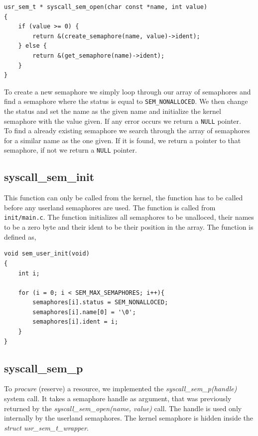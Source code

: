 \documentclass[11pt]{article}
\begin{document}
    \begin{lstlisting}[style=customc]
usr_sem_t * syscall_sem_open(char const *name, int value)
{
    if (value >= 0) {
        return &(create_semaphore(name, value)->ident);
    } else {
        return &(get_semaphore(name)->ident);
    }
}
    \end{lstlisting}

    To create a new semaphore we simply loop through our array of semaphores and
    find a semaphore where the status is equal to \texttt{SEM\_NONALLOCED}.  We
    then change the status and set the name as the given name and initialize the
    kernel semaphore with the value given.  If any error occurs we return a
    \texttt{NULL} pointer. \\

    To find a already existing semaphore we search through the array of
    semaphores for a similar name as the one given.  If it is found, we return
    a pointer to that semaphore, if not we return a \texttt{NULL} pointer.

    \subsection{syscall\_sem\_init}
    This function can only be called from the kernel, the function has to be
    called before any userland semaphores are used.  The function is called from
    \texttt{init/main.c}.  The function initializes all semaphores to be
    unalloced, their names to be a zero byte and their ident to be their
    position in the array.  The function is defined as,

    \begin{lstlisting}[style=customc]
void sem_user_init(void)
{
    int i;

    for (i = 0; i < SEM_MAX_SEMAPHORES; i++){
        semaphores[i].status = SEM_NONALLOCED;
        semaphores[i].name[0] = '\0';
        semaphores[i].ident = i;
    }
}
    \end{lstlisting}

\subsection{syscall\_sem\_p}
To \emph{procure} (reserve) a resource, we implemented the \emph{syscall\_sem\_p(handle)} system call. It takes a semaphore handle as argument, that was previously returned by the \emph{syscall\_sem\_open(name, value)} call. The handle is used only internally by the userland semaphores. The kernel semaphore is hidden inside the \emph{struct usr\_sem\_t\_wrapper}.
\end{document}
